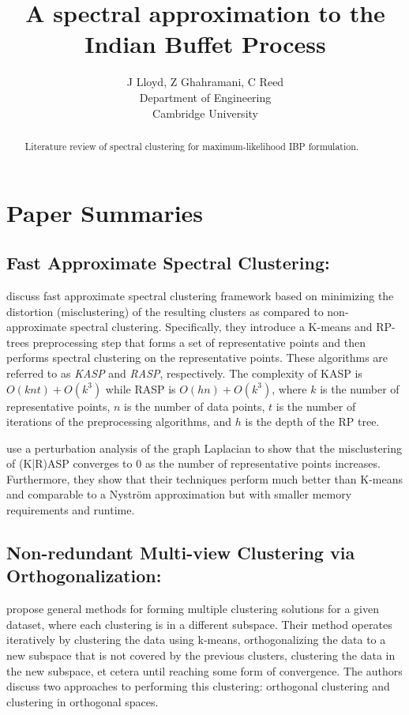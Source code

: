 \documentclass{article}
\title{
A spectral approximation to the Indian Buffet Process
}
\author{
J Lloyd, Z Ghahramani, C Reed\\
Department of Engineering\\
Cambridge University\\
}
\numberwithin{equation}{section}
\numberwithin{thm}{section}
\begin{document}
\maketitle

\begin{abstract}
Literature review of spectral clustering for maximum-likelihood IBP formulation.
\end{abstract}

\section{Paper Summaries}
\subsection{Fast Approximate Spectral Clustering: \citet{yan2009fast}}
\citet{yan2009fast} discuss fast approximate spectral clustering framework based on minimizing the distortion (misclustering) of the resulting clusters as compared to non-approximate spectral clustering. Specifically, they introduce a K-means and RP-trees preprocessing step that forms a set of representative points and then performs spectral clustering on the representative points. These algorithms are referred to as \textit{KASP} and \textit{RASP}, respectively. The complexity of KASP is $O(knt) + O(k^3)$ while RASP is $O(hn) + O(k^3)$, where $k$ is the number of representative points, $n$ is the number of data points, $t$ is the number of iterations of the preprocessing algorithms, and $h$ is the depth of the RP tree.

\citet{yan2009fast} use a perturbation analysis of the graph Laplacian to show that the misclustering of (K|R)ASP converges to 0 as the number of representative points increases. Furthermore, they show that their techniques perform much better than K-means and comparable to a Nystr\"om approximation but with smaller memory requirements and runtime.


\subsection{Non-redundant Multi-view Clustering via Orthogonalization: \citet{Cui2007}}
\citet{Cui2007} propose general methods for forming multiple clustering solutions for a given dataset, where each clustering is in a different subspace. Their method operates iteratively by clustering the data using k-means, orthogonalizing the data to a new subspace that is not covered by the previous clusters, clustering the data in the new subspace, et cetera until reaching some form of convergence.  The authors discuss two approaches to performing this clustering: orthogonal clustering and clustering in orthogonal spaces.
\end{document}

